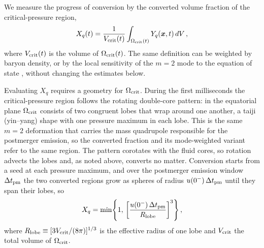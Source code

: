 We measure the progress of conversion by the converted volume fraction of the critical-pressure region,
\begin{equation}
X_q(t)
=\frac{1}{V_{\rm crit}(t)}
\int_{\Omega_{\rm crit}(t)}Y_q(\boldsymbol{x},t)\,dV\,,
\label{eq:converted_fraction}
\end{equation}
where $V_{\rm crit}(t)$ is the volume of $\Omega_{\rm crit}(t)$.
The same definition can be weighted by baryon density, or by the local sensitivity of the $m=2$ mode to the equation of state , without changing the estimates below.

Evaluating $X_q$ requires a geometry for $\Omega_{\rm crit}$.
During the first milliseconds the critical-pressure region follows the rotating double-core pattern: in the equatorial plane $\Omega_{\rm crit}$ consists of two congruent lobes that wrap around one another, a taiji (yin--yang) shape with one pressure maximum in each lobe.
This is the same $m=2$ deformation that carries the mass quadrupole responsible for the postmerger emission, so the converted fraction and its mode-weighted variant refer to the same region.
The pattern corotates with the fluid cores, so rotation advects the lobes and, as noted above, converts no matter.
Conversion starts from a seed at each pressure maximum, and over the postmerger emission window $\Delta t_{\rm pm}$ the two converted regions grow as spheres of radius $u(0^-)\,\Delta t_{\rm pm}$ until they span their lobes, so
\begin{equation}
X_q
=\min\!\left\{1,\,
\left[\frac{u(0^-)\,\Delta t_{\rm pm}}{R_{\rm lobe}}\right]^{3}
\right\},
\label{eq:lobe_fraction}
\end{equation}
where $R_{\rm lobe}\equiv[3V_{\rm crit}/(8\pi)]^{1/3}$ is the effective radius of one lobe and $V_{\rm crit}$ the total volume of $\Omega_{\rm crit}$.

